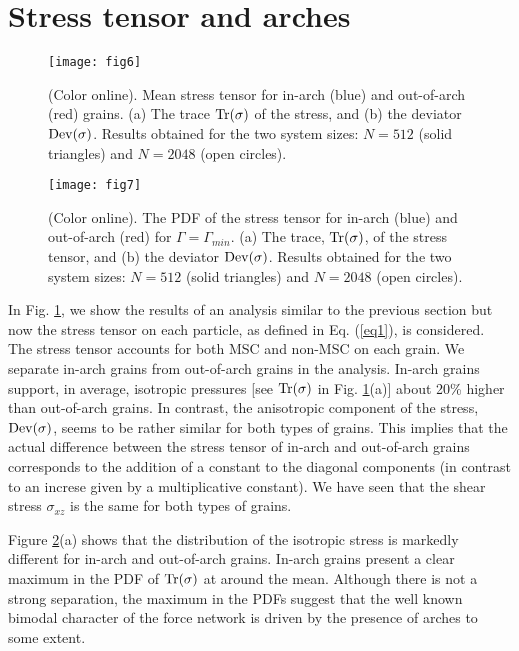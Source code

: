\section{Stress tensor and arches}  

\begin{figure}[t]
\centering
\texttt{[image: fig6]}
\caption {(Color online). Mean stress tensor for in-arch (blue) and out-of-arch (red) grains. (a) The trace $\rm{Tr}(\sigma)$ of the stress, and (b) the deviator $\rm{Dev}(\sigma)$. Results obtained for the two system sizes: $N=512$ (solid triangles) and $N=2048$ (open circles).}
\label{fig6}
\end{figure}

\begin{figure}[t]
\centering
\texttt{[image: fig7]}
\caption {(Color online). The PDF of the stress tensor for in-arch (blue) and out-of-arch (red) for $\Gamma=\Gamma_{min}$. (a) The trace, $\rm{Tr}(\sigma)$, of the stress tensor, and (b) the deviator $\rm{Dev}(\sigma)$. Results obtained for the two system sizes: $N=512$ (solid triangles) and $N=2048$ (open circles).}
\label{fig7}
\end{figure}

In Fig. \ref{fig6}, we show the results of an analysis similar to the previous section but now the stress tensor on each particle, as defined in Eq. (\ref{eq1}), is considered. The stress tensor accounts for both MSC and non-MSC on each grain. We separate in-arch grains from out-of-arch grains in the analysis. In-arch grains support, in average, isotropic pressures [see $\rm{Tr}(\sigma)$ in Fig. \ref{fig6}(a)] about 20\% higher than out-of-arch grains. In contrast, the anisotropic component of the stress, $\rm{Dev}(\sigma)$, seems to be rather similar for both types of grains. This implies that the actual difference between the stress tensor of in-arch and out-of-arch grains corresponds to the addition of a constant to the diagonal components (in contrast to an increse given by a multiplicative constant). We have seen that the shear stress $\sigma_{xz}$ is the same for both types of grains.

Figure \ref{fig7}(a) shows that the distribution of the isotropic stress is markedly different for in-arch and out-of-arch grains. In-arch grains present a clear maximum in the PDF of $\rm{Tr}(\sigma)$ at around the mean. Although there is not a strong separation, the maximum in the PDFs suggest that the well known bimodal character of the force network is driven by the presence of arches to some extent.

